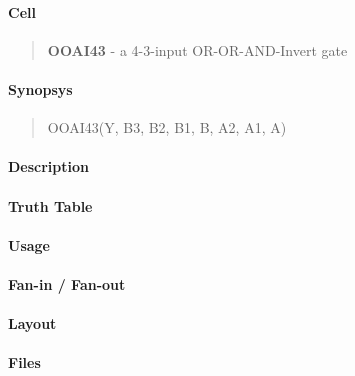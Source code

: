 \label{OOAI43}
\paragraph{Cell}
\begin{quote}
    \textbf{OOAI43} - a 4-3-input OR-OR-AND-Invert gate
\end{quote}

\paragraph{Synopsys}
\begin{quote}
    OOAI43(Y, B3, B2, B1, B, A2, A1, A)
\end{quote}

\paragraph{Description}

%

\paragraph{Truth Table}
%

\paragraph{Usage}

\paragraph{Fan-in / Fan-out}

\paragraph{Layout}

\paragraph{Files}
